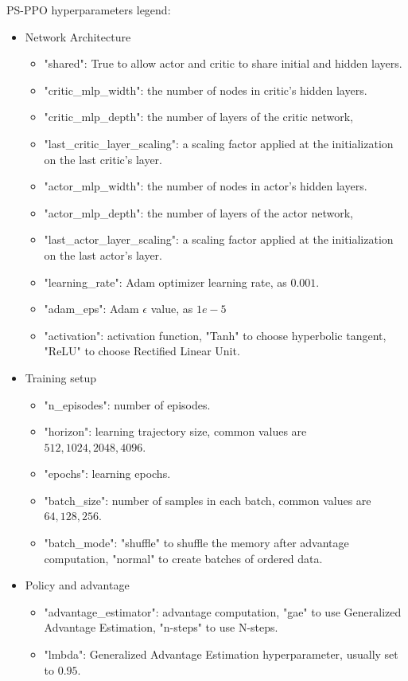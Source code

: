 \documentclass[11pt, a4paper, hidelinks]{report}
\begin{document}
PS-PPO hyperparameters legend:
\begin{itemize}
	\item Network Architecture
	\begin{itemize}
		\item "shared": True to allow actor and critic to share initial and hidden layers.
		\item "critic\_mlp\_width": the number of nodes in critic's hidden layers.
		\item "critic\_mlp\_depth": the number of layers of the critic network,
		\item "last\_critic\_layer\_scaling": a scaling factor applied at the initialization on the last critic's layer.
		\item "actor\_mlp\_width": the number of nodes in actor's hidden layers.
		\item "actor\_mlp\_depth": the number of layers of the actor network,
		\item "last\_actor\_layer\_scaling": a scaling factor applied at the initialization on the last actor's layer.
		\item "learning\_rate": Adam optimizer learning rate, as $0.001$.
		\item "adam\_eps": Adam $\epsilon$ value, as $1e-5$
		\item "activation": activation function, "Tanh" to choose hyperbolic tangent, "ReLU" to choose Rectified Linear Unit.
	\end{itemize}
	\item Training setup
	\begin{itemize}
		\item "n\_episodes": number of episodes.
		\item "horizon": learning trajectory size, common values are $512, 1024, 2048, 4096$.
		\item "epochs": learning epochs.
		\item "batch\_size": number of samples in each batch, common values are $64, 128, 256$.
		\item "batch\_mode": "shuffle" to shuffle the memory after advantage computation, "normal" to create batches of ordered data.
	\end{itemize}
	\item Policy and advantage
	\begin{itemize}
		\item "advantage\_estimator": advantage computation, "gae" to use Generalized Advantage Estimation, "n-steps" to use N-steps.
		\item "lmbda": Generalized Advantage Estimation hyperparameter, usually set to $0.95$.

\end{itemize}
\end{itemize}
\end{document}
